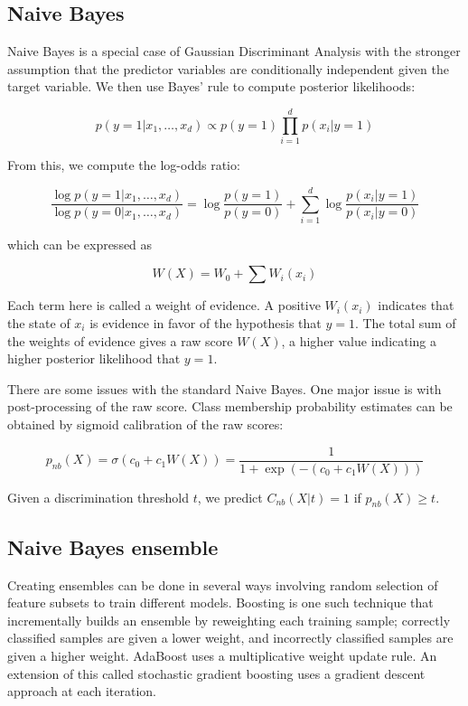 \documentclass[sigconf]{acmart}
\begin{document}
\subsection{Naive Bayes}
Naive Bayes is a special case of Gaussian Discriminant Analysis with the stronger assumption that the predictor variables are conditionally independent given the target variable. We then use Bayes' rule to compute posterior likelihoods:

\begin{equation}
p(y=1|x_1,\ldots,x_d) \propto p(y=1)\prod\limits_{i=1}^d p(x_i|y=1)
\label{eq:1}
\end{equation}

From this, we compute the log-odds ratio:

\begin{equation}
\frac{\log p(y=1|x_1,\ldots,x_d)}{\log p(y=0|x_1,\ldots,x_d)} = \log \frac{p(y=1)}{p(y=0)} + \sum\limits_{i=1}^d \log \frac{p(x_i|y=1)}{p(x_i|y=0)}
\label{eq:2}
\end{equation}

which can be expressed as

\begin{equation}
W(X) = W_0 + \sum W_i(x_i)
\label{eq:3}
\end{equation}

Each term here is called a weight of evidence. A positive $W_i(x_i)$ indicates that the state of $x_i$ is evidence in favor of the hypothesis that $y=1$. The total sum of the weights of evidence gives a raw score $W(X)$, a higher value indicating a higher posterior likelihood that $y=1$.

There are some issues with the standard Naive Bayes. One major issue is with post-processing of the raw score. Class membership probability estimates can be obtained by sigmoid calibration of the raw scores:

\begin{equation}
p_{nb}(X) = \sigma(c_0 + c_1 W(X)) = \frac{1}{1 + \exp(-(c_0 + c_1 W(X)))}
\label{eq:4}
\end{equation}

Given a discrimination threshold $t$, we predict $C_{nb}(X|t) = 1$ if $p_{nb}(X) \geq t$.

\subsection{Naive Bayes ensemble}
Creating ensembles can be done in several ways involving random selection of feature subsets to train different models. Boosting is one such technique that incrementally builds an ensemble by reweighting each training sample; correctly classified samples are given a lower weight, and incorrectly classified samples are given a higher weight. AdaBoost \cite{freund1997decision} uses a multiplicative weight update rule. An extension of this called stochastic gradient boosting uses a gradient descent approach at each iteration.
\end{document}
